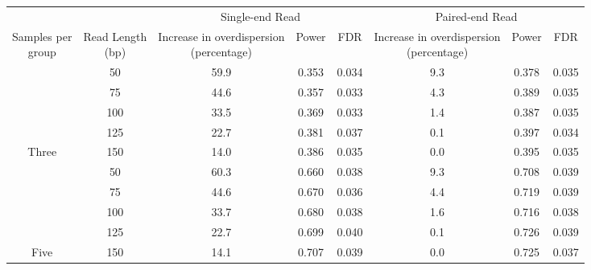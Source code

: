
\begin{tabular}[t]{cccccccc}
\toprule
\multicolumn{2}{c}{ } & \multicolumn{3}{c}{Single-end Read} & \multicolumn{3}{c}{Paired-end Read} \\
\cmidrule(l{3pt}r{3pt}){3-5} \cmidrule(l{3pt}r{3pt}){6-8}
\makecell[c]{Samples per\\group} & \makecell[c]{Read Length\\(bp)} & \makecell[c]{Increase in overdispersion \\(percentage)} & Power & FDR & \makecell[c]{Increase in overdispersion \\(percentage)} & Power & FDR\\
\midrule
 & 50 & 59.9 & 0.353 & 0.034 & 9.3 & 0.378 & 0.035\\

 & 75 & 44.6 & 0.357 & 0.033 & 4.3 & 0.389 & 0.035\\

 & 100 & 33.5 & 0.369 & 0.033 & 1.4 & 0.387 & 0.035\\

 & 125 & 22.7 & 0.381 & 0.037 & 0.1 & 0.397 & 0.034\\

\multirow{-5}{*}{\centering\arraybackslash Three} & 150 & 14.0 & 0.386 & 0.035 & 0.0 & 0.395 & 0.035\\
\cmidrule{1-8}
 & 50 & 60.3 & 0.660 & 0.038 & 9.3 & 0.708 & 0.039\\

 & 75 & 44.6 & 0.670 & 0.036 & 4.4 & 0.719 & 0.039\\

 & 100 & 33.7 & 0.680 & 0.038 & 1.6 & 0.716 & 0.038\\

 & 125 & 22.7 & 0.699 & 0.040 & 0.1 & 0.726 & 0.039\\

\multirow{-5}{*}{\centering\arraybackslash Five} & 150 & 14.1 & 0.707 & 0.039 & 0.0 & 0.725 & 0.037\\
\bottomrule
\end{tabular}
